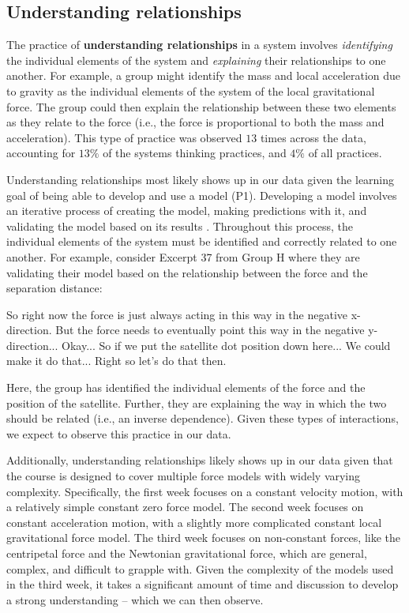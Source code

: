 \documentclass{msuphddissertation}
\begin{document}
\begin{doublespace}
\begin{appendices}
\section*{Understanding relationships}

The practice of \textbf{understanding relationships} in a system involves \textit{identifying} the individual elements of the system and \textit{explaining} their relationships to one another.  For example, a group might identify the mass and local acceleration due to gravity as the individual elements of the system of the local gravitational force.  The group could then explain the relationship between these two elements as they relate to the force (i.e., the force is proportional to both the mass and acceleration).  This type of practice was observed $13$ times across the data, accounting for $13\%$ of the systems thinking practices, and $4\%$ of all practices.

Understanding relationships most likely shows up in our data given the learning goal of being able to develop and use a model (P1).  Developing a model involves an iterative process of creating the model, making predictions with it, and validating the model based on its results \cite{AAPT2016}.  Throughout this process, the individual elements of the system must be identified and correctly related to one another.  For example, consider Excerpt 37 from Group H where they are validating their model based on the relationship between the force and the separation distance: \begin{description}
\SC So right now the force is just always acting in this way {in the negative x-direction}.
\SC But the force needs to eventually point this way {in the negative y-direction}...
\SB Okay...
\SC So if we put the satellite dot position down here...
\SC We could make it do that...
\SA Right so let's do that then.
\end{description}  Here, the group has identified the individual elements of the force and the position of the satellite.  Further, they are explaining the way in which the two should be related (i.e., an inverse dependence).  Given these types of interactions, we expect to observe this practice in our data.

Additionally, understanding relationships likely shows up in our data given that the course is designed to cover multiple force models with widely varying complexity.  Specifically, the first week focuses on a constant velocity motion, with a relatively simple constant zero force model.  The second week focuses on constant acceleration motion, with a slightly more complicated constant local gravitational force model.  The third week focuses on non-constant forces, like the centripetal force and the Newtonian gravitational force, which are general, complex, and difficult to grapple with.  Given the complexity of the models used in the third week, it takes a significant amount of time and discussion to develop a strong understanding -- which we can then observe.


\end{appendices}
\end{doublespace}
\end{document}
